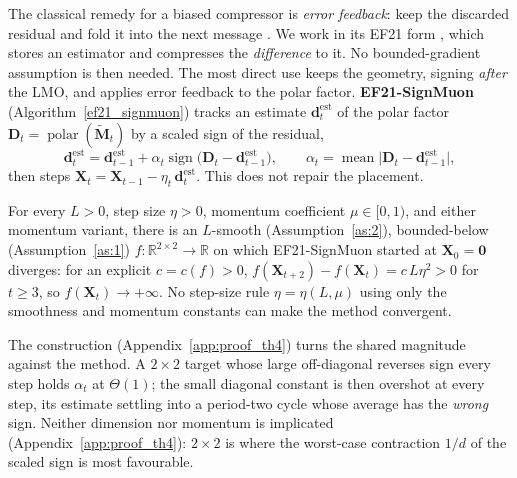 The classical remedy for a biased compressor is \emph{error feedback}: keep the discarded residual and fold it into the next message \citep{seide20141bit,karimireddy2019efsign}. We work in its EF21 form \citep{richtarik2021ef21}, which stores an estimator and compresses the \emph{difference} to it. No bounded-gradient assumption is then needed. The most direct use keeps the geometry, signing \emph{after} the LMO, and applies error feedback to the polar factor. \textbf{EF21-SignMuon} (Algorithm~\ref{ef21_signmuon}) tracks an estimate $\mathbf{d}_t^{\mathrm{est}}$ of the polar factor $\mathbf{D}_t=\operatorname{polar}(\tilde{\mathbf{M}}_t)$ by a scaled sign of the residual,
\begin{equation}\label{eq:efsm_est}
\mathbf{d}_t^{\mathrm{est}}=\mathbf{d}_{t-1}^{\mathrm{est}}+\alpha_t\operatorname{sign}\!\bigl(\mathbf{D}_t-\mathbf{d}_{t-1}^{\mathrm{est}}\bigr),
\qquad
\alpha_t=\operatorname{mean}\bigl|\mathbf{D}_t-\mathbf{d}_{t-1}^{\mathrm{est}}\bigr|,
\end{equation}
then steps $\mathbf{X}_t=\mathbf{X}_{t-1}-\eta_t\,\mathbf{d}_t^{\mathrm{est}}$. This does not repair the placement.
\setcounter{theorem}{3}
\begin{theorem}\label{th:ef_div}
For every $L>0$, step size $\eta>0$, momentum coefficient $\mu\in[0,1)$, and either momentum variant, there is an $L$-smooth (Assumption~\ref{as:2}), bounded-below (Assumption~\ref{as:1}) $f:\mathbb{R}^{2\times2}\!\to\mathbb{R}$ on which EF21-SignMuon started at $\mathbf{X}_0=\mathbf{0}$ diverges: for an explicit $c=c(f)>0$, $f(\mathbf{X}_{t+2})-f(\mathbf{X}_t)=c\,L\eta^2>0$ for $t\ge3$, so $f(\mathbf{X}_t)\to+\infty$. No step-size rule $\eta=\eta(L,\mu)$ using only the smoothness and momentum constants can make the method convergent.
\end{theorem}
The construction (Appendix~\ref{app:proof_th4}) turns the shared magnitude against the method. A $2\times2$ target whose large off-diagonal reverses sign every step holds $\alpha_t$ at $\Theta(1)$; the small diagonal constant is then overshot at every step, its estimate settling into a period-two cycle whose average has the \emph{wrong} sign. Neither dimension nor momentum is implicated (Appendix~\ref{app:proof_th4}): $2\times2$ is where the worst-case contraction $1/d$ of the scaled sign is most favourable.

